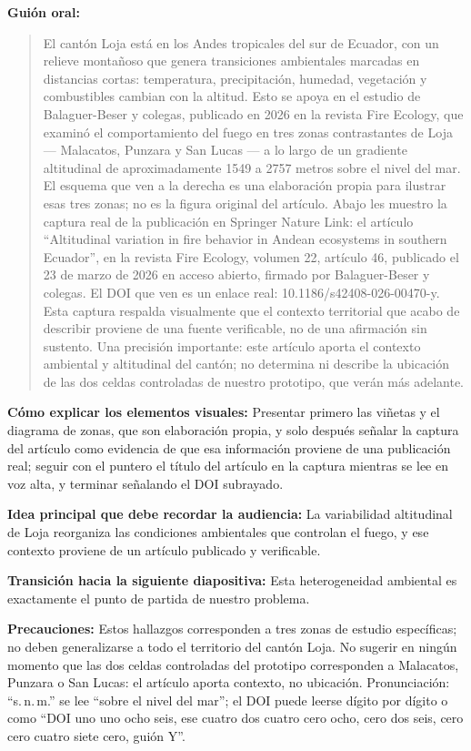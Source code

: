 \documentclass[11pt,a4paper]{article}
\newcommand{\campo}[2]{\par\medskip\noindent\textbf{#1:} #2\par}
\newenvironment{guionoral}{%
  \medskip\noindent\textbf{Gui\'on oral:}\par\smallskip
  \begin{quote}\small
}{%
  \end{quote}
}
\begin{document}
\begin{guionoral}
El cant\'on Loja est\'a en los Andes tropicales del sur de Ecuador, con
un relieve monta\~noso que genera transiciones ambientales marcadas en
distancias cortas: temperatura, precipitaci\'on, humedad, vegetaci\'on
y combustibles cambian con la altitud. Esto se apoya en el estudio de
Balaguer-Beser y colegas, publicado en 2026 en la revista Fire
Ecology, que examin\'o el comportamiento del fuego en tres zonas
contrastantes de Loja --- Malacatos, Punzara y San Lucas --- a lo
largo de un gradiente altitudinal de aproximadamente 1549 a 2757
metros sobre el nivel del mar. El esquema que ven a la derecha es una
elaboraci\'on propia para ilustrar esas tres zonas; no es la figura
original del art\'iculo. Abajo les muestro la captura real de la
publicaci\'on en Springer Nature Link: el art\'iculo ``Altitudinal
variation in fire behavior in Andean ecosystems in southern
Ecuador'', en la revista Fire Ecology, volumen 22, art\'iculo 46,
publicado el 23 de marzo de 2026 en acceso abierto, firmado por
Balaguer-Beser y colegas. El DOI que ven es un enlace real:
10.1186/s42408-026-00470-y. Esta captura respalda visualmente que el
contexto territorial que acabo de describir proviene de una fuente
verificable, no de una afirmaci\'on sin sustento. Una precisi\'on
importante: este art\'iculo aporta el contexto ambiental y
altitudinal del cant\'on; no determina ni describe la ubicaci\'on de
las dos celdas controladas de nuestro prototipo, que ver\'an m\'as
adelante.
\end{guionoral}

\campo{C\'omo explicar los elementos visuales}{Presentar primero las
vi\~netas y el diagrama de zonas, que son elaboraci\'on propia, y solo
despu\'es se\~nalar la captura del art\'iculo como evidencia de que
esa informaci\'on proviene de una publicaci\'on real; seguir con el
puntero el t\'itulo del art\'iculo en la captura mientras se lee en
voz alta, y terminar se\~nalando el DOI subrayado.}
\campo{Idea principal que debe recordar la audiencia}{La variabilidad
altitudinal de Loja reorganiza las condiciones ambientales que
controlan el fuego, y ese contexto proviene de un art\'iculo publicado
y verificable.}
\campo{Transici\'on hacia la siguiente diapositiva}{Esta heterogeneidad
ambiental es exactamente el punto de partida de nuestro problema.}
\campo{Precauciones}{Estos hallazgos corresponden a tres zonas de
estudio espec\'ificas; no deben generalizarse a todo el territorio del
cant\'on Loja. No sugerir en ning\'un momento que las dos celdas
controladas del prototipo corresponden a Malacatos, Punzara o San
Lucas: el art\'iculo aporta contexto, no ubicaci\'on. Pronunciaci\'on:
``s.\,n.\,m.'' se lee ``sobre el nivel del mar''; el DOI puede leerse
d\'igito por d\'igito o como ``DOI uno uno ocho seis, ese cuatro dos
cuatro cero ocho, cero dos seis, cero cero cuatro siete cero, gui\'on
Y''.}
\end{document}
